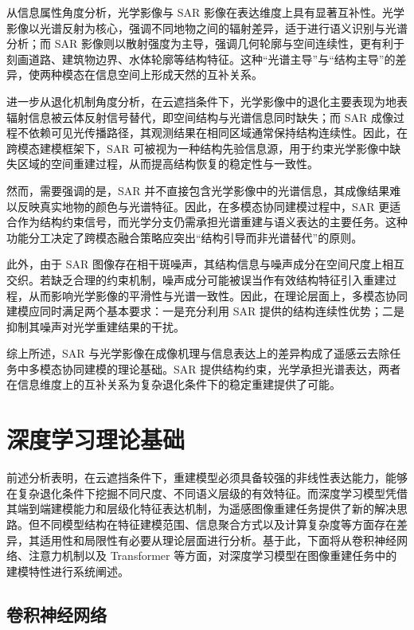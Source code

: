 从信息属性角度分析，光学影像与 SAR 影像在表达维度上具有显著互补性。光学影像以光谱反射为核心，强调不同地物之间的辐射差异，适于进行语义识别与光谱分析；而 SAR 影像则以散射强度为主导，强调几何轮廓与空间连续性，更有利于刻画道路、建筑物边界、水体轮廓等结构特征。这种“光谱主导”与“结构主导”的差异，使两种模态在信息空间上形成天然的互补关系。

进一步从退化机制角度分析，在云遮挡条件下，光学影像中的退化主要表现为地表辐射信息被云体反射信号替代，即空间结构与光谱信息同时缺失；而 SAR 成像过程不依赖可见光传播路径，其观测结果在相同区域通常保持结构连续性。因此，在跨模态建模框架下，SAR 可被视为一种结构先验信息源，用于约束光学影像中缺失区域的空间重建过程，从而提高结构恢复的稳定性与一致性。

然而，需要强调的是，SAR 并不直接包含光学影像中的光谱信息，其成像结果难以反映真实地物的颜色与光谱特征。因此，在多模态协同建模过程中，SAR 更适合作为结构约束信号，而光学分支仍需承担光谱重建与语义表达的主要任务。这种功能分工决定了跨模态融合策略应突出“结构引导而非光谱替代”的原则。

此外，由于 SAR 图像存在相干斑噪声，其结构信息与噪声成分在空间尺度上相互交织。若缺乏合理的约束机制，噪声成分可能被误当作有效结构特征引入重建过程，从而影响光学影像的平滑性与光谱一致性。因此，在理论层面上，多模态协同建模应同时满足两个基本要求：一是充分利用 SAR 提供的结构连续性优势；二是抑制其噪声对光学重建结果的干扰。

综上所述，SAR 与光学影像在成像机理与信息表达上的差异构成了遥感云去除任务中多模态协同建模的理论基础。SAR 提供结构约束，光学承担光谱表达，两者在信息维度上的互补关系为复杂退化条件下的稳定重建提供了可能。

\section{深度学习理论基础}

前述分析表明，在云遮挡条件下，重建模型必须具备较强的非线性表达能力，能够在复杂退化条件下挖掘不同尺度、不同语义层级的有效特征。而深度学习模型凭借其端到端建模能力和层级化特征表达机制，为遥感图像重建任务提供了新的解决思路。但不同模型结构在特征建模范围、信息聚合方式以及计算复杂度等方面存在差异，其适用性和局限性有必要从理论层面进行分析。基于此，下面将从卷积神经网络、注意力机制以及 Transformer 等方面，对深度学习模型在图像重建任务中的建模特性进行系统阐述。

\subsection{卷积神经网络}

